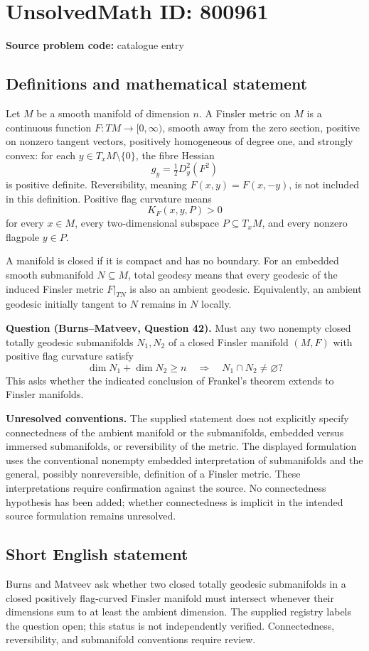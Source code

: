 \documentclass[11pt]{article}
\begin{document}
\section*{UnsolvedMath ID: 800961}
\textbf{Source problem code:} catalogue entry
\subsection{Definitions and mathematical statement}
Let \(M\) be a smooth manifold of dimension \(n\). A Finsler metric on \(M\) is a continuous function \(F:TM\to[0,\infty)\), smooth away from the zero section, positive on nonzero tangent vectors, positively homogeneous of degree one, and strongly convex: for each \(y\in T_xM\setminus\{0\}\), the fibre Hessian
\[
g_y=\tfrac12 D_y^2(F^2)
\]
is positive definite. Reversibility, meaning \(F(x,y)=F(x,-y)\), is not included in this definition. Positive flag curvature means
\[
K_F(x,y,P)>0
\]
for every \(x\in M\), every two-dimensional subspace \(P\subseteq T_xM\), and every nonzero flagpole \(y\in P\).

A manifold is closed if it is compact and has no boundary. For an embedded smooth submanifold \(N\subseteq M\), total geodesy means that every geodesic of the induced Finsler metric \(F|_{TN}\) is also an ambient geodesic. Equivalently, an ambient geodesic initially tangent to \(N\) remains in \(N\) locally.

\textbf{Question (Burns--Matveev, Question 42).} Must any two nonempty closed totally geodesic submanifolds \(N_1,N_2\) of a closed Finsler manifold \((M,F)\) with positive flag curvature satisfy
\[
\dim N_1+\dim N_2\geq n
\quad\Longrightarrow\quad
N_1\cap N_2\neq\varnothing?
\]
This asks whether the indicated conclusion of Frankel's theorem extends to Finsler manifolds.

\textbf{Unresolved conventions.} The supplied statement does not explicitly specify connectedness of the ambient manifold or the submanifolds, embedded versus immersed submanifolds, or reversibility of the metric. The displayed formulation uses the conventional nonempty embedded interpretation of submanifolds and the general, possibly nonreversible, definition of a Finsler metric. These interpretations require confirmation against the source. No connectedness hypothesis has been added; whether connectedness is implicit in the intended source formulation remains unresolved.
\subsection{Short English statement}
Burns and Matveev ask whether two closed totally geodesic submanifolds in a closed positively flag-curved Finsler manifold must intersect whenever their dimensions sum to at least the ambient dimension. The supplied registry labels the question open; this status is not independently verified. Connectedness, reversibility, and submanifold conventions require review.
\end{document}
